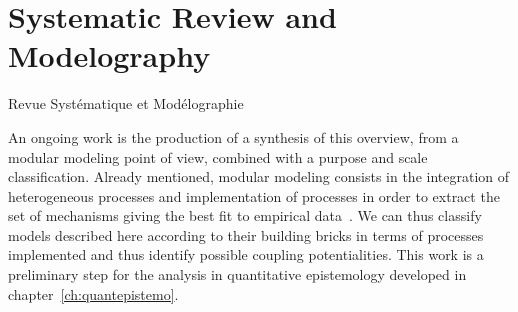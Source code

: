 



\section{Systematic Review and Modelography}{Revue Systématique et Modélographie}

An ongoing work is the production of a synthesis of this overview, from a modular modeling point of view, combined with a purpose and scale classification. Already mentioned, modular modeling consists in the integration of heterogeneous processes and implementation of processes in order to extract the set of mechanisms giving the best fit to empirical data~\cite{cottineau2015incremental}. We can thus classify models described here according to their building bricks in terms of processes implemented and thus identify possible coupling potentialities. This work is a preliminary step for the analysis in quantitative epistemology developed in chapter~\ref{ch:quantepistemo}.




